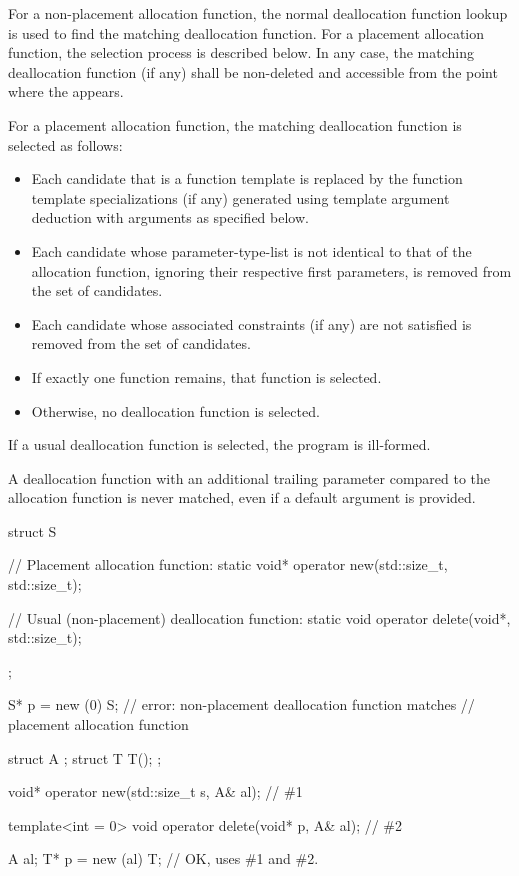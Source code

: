 \pnum
For a non-placement allocation function, the normal deallocation
function lookup is used to find the matching deallocation
function.
For a placement allocation function, the selection process is described below.
In any case,
the matching deallocation function (if any) shall be non-deleted and
accessible from the point where the  appears.

\pnum
For a placement allocation function,
the matching deallocation function is selected as follows:
\begin{itemize}
\item
Each candidate that is a function template is replaced by
the function template specializations (if any)
generated using template argument deduction
with arguments as specified below.
\item
Each candidate whose parameter-type-list is not identical to
that of the allocation function,
ignoring their respective first parameters,
is removed from the set of candidates.
\item
Each candidate whose associated constraints (if any)
are not satisfied
is removed from the set of candidates.
\item
If exactly one function remains, that function is selected.
\item
Otherwise, no deallocation function is selected.
\end{itemize}
If a usual deallocation function is selected, the program is ill-formed.
\begin{note}
A deallocation function with an additional trailing parameter
compared to the allocation function is never matched,
even if a default argument is provided.
\end{note}

\pnum
\begin{example}
\begin{codeblock}
struct S {
  // Placement allocation function:
  static void* operator new(std::size_t, std::size_t);

  // Usual (non-placement) deallocation function:
  static void operator delete(void*, std::size_t);
};

S* p = new (0) S;   // error: non-placement deallocation function matches
                    // placement allocation function
\end{codeblock}
\end{example}

\begin{example}
\begin{codeblock}
struct A {};
struct T { T(); };

void* operator new(std::size_t s, A& al);       // \#1

template<int = 0>
void operator delete(void* p, A& al);           // \#2

A al;
T* p = new (al) T;                              // OK, uses \#1 and \#2.
\end{codeblock}
\end{example}

